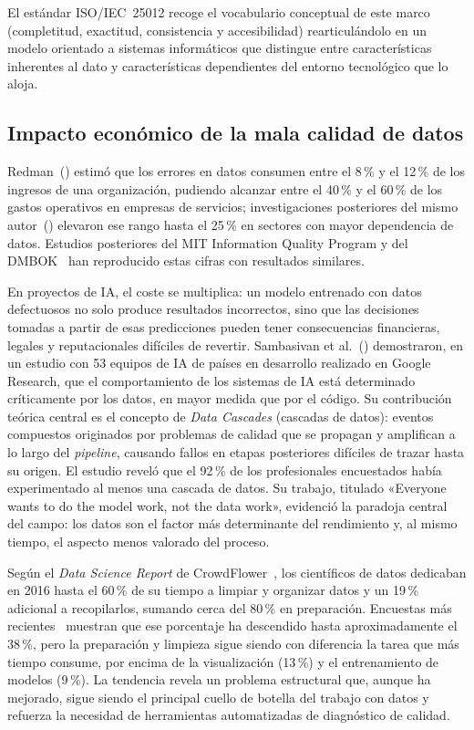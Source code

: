 El estándar \ac{ISO}/IEC~25012 recoge el vocabulario conceptual de este
marco (completitud, exactitud, consistencia y accesibilidad) rearticulándolo
en un modelo orientado a sistemas informáticos que distingue entre
características inherentes al dato y características dependientes del entorno
tecnológico que lo aloja.

\subsection{Impacto económico de la mala calidad de datos}

Redman~(\citeyear{redman1998}) estimó que los errores en datos consumen entre
el 8\,\% y el 12\,\% de los ingresos de una organización, pudiendo alcanzar
entre el 40\,\% y el 60\,\% de los gastos operativos en empresas de servicios;
investigaciones posteriores del mismo autor~(\citeyear{redman2001}) elevaron
ese rango hasta el 25\,\% en sectores con mayor dependencia de datos. Estudios posteriores del MIT Information Quality Program y del
\ac{DMBOK}~\citep{dmbok2017} han reproducido estas cifras con resultados
similares.

En proyectos de \ac{IA}, el coste se multiplica: un modelo entrenado con datos
defectuosos no solo produce resultados incorrectos, sino que las decisiones
tomadas a partir de esas predicciones pueden tener consecuencias financieras,
legales y reputacionales difíciles de revertir.
Sambasivan et al.~(\citeyear{sambasivan2021}) demostraron, en un estudio con
53 equipos de \ac{IA} de países en desarrollo realizado en Google Research,
que el comportamiento de los sistemas de \ac{IA} está determinado
críticamente por los datos, en mayor medida que por el código. Su
contribución teórica central es el concepto de \emph{Data Cascades}
(cascadas de datos): eventos compuestos originados por problemas de calidad
que se propagan y amplifican a lo largo del \emph{pipeline}, causando fallos
en etapas posteriores difíciles de trazar hasta su origen. El estudio reveló
que el 92\,\% de los profesionales encuestados había experimentado al menos
una cascada de datos. Su trabajo, titulado «Everyone wants to do the model
work, not the data work», evidenció la paradoja central del campo: los datos
son el factor más determinante del rendimiento y, al mismo tiempo, el aspecto
menos valorado del proceso.

Según el \emph{Data Science Report} de CrowdFlower~\citep{crowdflower2016},
los científicos de datos dedicaban en 2016 hasta el 60\,\% de su tiempo a
limpiar y organizar datos y un 19\,\% adicional a recopilarlos, sumando cerca
del 80\,\% en preparación. Encuestas más recientes~\citep{anaconda2022}
muestran que ese porcentaje ha descendido hasta aproximadamente el 38\,\%,
pero la preparación y limpieza sigue siendo con diferencia la tarea que más
tiempo consume, por encima de la visualización (13\,\%) y el entrenamiento
de modelos (9\,\%). La tendencia revela un problema estructural que,
aunque ha mejorado, sigue siendo el principal cuello de botella del trabajo
con datos y refuerza la necesidad de herramientas automatizadas de diagnóstico
de calidad.

